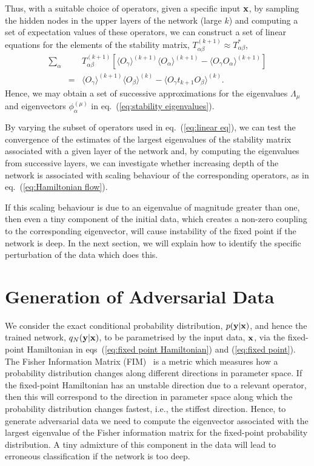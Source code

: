 \documentclass[reprint,amsmath,amssymb,aps]{revtex4-1}
\begin{document}
Thus, with a suitable choice of operators, given a specific input ${\bf x}$, by sampling the hidden nodes in the upper layers of the network (large $k$) and computing a set of expectation values of these operators, we can construct a set of linear equations for the elements of the stability matrix, $T^{(k+1)}_{\alpha\beta} \approx T^*_{\alpha\beta}$,
\begin{eqnarray}
\sum_\alpha&&{T^{(k+1)}_{\alpha\beta}\left[\langle O_\gamma\rangle^{(k+1)}\langle O_\alpha\rangle^{(k+1)} - \langle O_\gamma O_\alpha\rangle^{(k+1)}\right]} \nonumber\\
&=&\langle O_\gamma\rangle^{(k+1)}\langle O_\beta\rangle^{(k)} - \langle O_\gamma t_{k+1} O_\beta\rangle^{(k)}.
\label{eq:linear eq}
\end{eqnarray}
Hence, we may obtain a set of successive approximations for the eigenvalues $\Lambda_\mu$ and eigenvectors $\phi^{(\mu)}_\alpha$ in eq.~(\ref{eq:stability eigenvalues}).

By varying the subset of operators used in eq.~(\ref{eq:linear eq}), we can test the convergence of the estimates of the largest eigenvalues of the stability matrix associated with a given layer of the network and, by computing the eigenvalues from successive layers, we can investigate whether increasing depth of the network is associated with scaling behaviour of the corresponding operators, as in eq.~(\ref{eq:Hamiltonian flow}). 

If this scaling behaviour is due to an eigenvalue of magnitude greater than one, then even a tiny component of the initial data, which creates a non-zero coupling to the corresponding eigenvector, will cause instability of the fixed point if the network is deep. In the next section, we will explain how to identify the specific perturbation of the data which does this.

\section{\label{sec:data} Generation of Adversarial Data}

We consider the exact conditional probability distribution, $p({\bf y}|{\bf x})$, and hence the trained network, $q_N({\bf y}|{\bf x})$, to be parametrised by the input data, ${\bf x}$, via the fixed-point Hamiltonian in eqs~(\ref{eq:fixed point Hamiltonian}) and (\ref{eq:fixed point}). The Fisher Information Matrix (FIM)~\cite{MachtaChachraTranstrumSethna2013, RajuMachtaSethna2017} is a metric which measures how a probability distribution changes along different directions in parameter space. If the fixed-point Hamiltonian has an unstable direction due to a relevant operator, then this will correspond to the direction in parameter space along which the probability distribution changes fastest, i.e., the stiffest direction. Hence, to generate adversarial data we need to compute the eigenvector associated with the largest eigenvalue of the Fisher information matrix for the fixed-point probability distribution. A tiny admixture of this component in the data will lead to erroneous classification if the network is too deep.
\end{document}
